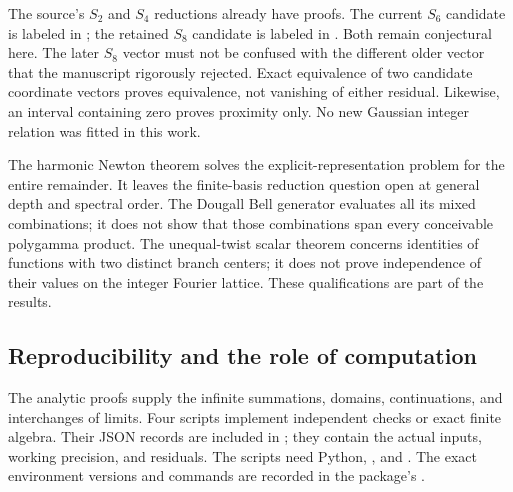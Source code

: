 The source's $S_2$ and $S_4$ reductions already have proofs.
The current $S_6$ candidate is labeled
 in
; the retained $S_8$
candidate is labeled  in
 \cite{RepoMain}.
Both remain conjectural here. The later $S_8$ vector must not
be confused with the different older vector that the manuscript
rigorously rejected. Exact equivalence of two candidate coordinate
vectors proves equivalence, not vanishing of either residual.
Likewise, an interval containing zero proves proximity only.
No new Gaussian integer relation was fitted in this work.

The harmonic Newton theorem solves the explicit-representation
problem for the entire remainder. It leaves the finite-basis
reduction question open at general depth and spectral order.
The Dougall Bell generator evaluates all its mixed combinations;
it does not show that those combinations span every conceivable
polygamma product. The unequal-twist scalar theorem concerns
identities of functions with two distinct branch centers;
it does not prove independence of their values on the integer
Fourier lattice. These qualifications are part of the results.

\subsection{Reproducibility and the role of computation}

The analytic proofs supply the infinite summations, domains,
continuations, and interchanges of limits. Four scripts implement
independent checks or exact finite algebra. Their JSON records
are included in ; they contain the actual inputs,
working precision, and residuals. The scripts need Python,
, and . The exact environment versions
and commands are recorded in the package's .

